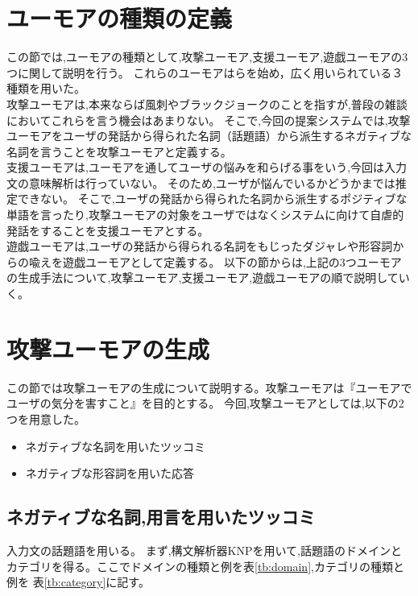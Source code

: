 \section{ユーモアの種類の定義}
この節では,ユーモアの種類として,攻撃ユーモア,支援ユーモア,遊戯ユーモアの3つに関して説明を行う。
これらのユーモアは\cite{UENO,Tani,牧野}らを始め，広く用いられている３種類を用いた。\\
\hspace{1zw}攻撃ユーモアは,本来ならば風刺やブラックジョークのことを指すが,普段の雑談においてこれらを言う機会はあまりない。
そこで,今回の提案システムでは,攻撃ユーモアをユーザの発話から得られた名詞（話題語）から派生するネガティブな名詞を言うことを攻撃ユーモアと定義する。\\
\hspace{1zw}支援ユーモアは,ユーモアを通してユーザの悩みを和らげる\cite{UENO}事をいう,今回は入力文の意味解析は行っていない。
そのため,ユーザが悩んでいるかどうかまでは推定できない。
そこで,ユーザの発話から得られた名詞から派生するポジティブな単語を言ったり,攻撃ユーモアの対象をユーザではなくシステムに向けて自虐的発話をすることを支援ユーモアとする。\\
\hspace{1zw}遊戯ユーモアは,ユーザの発話から得られる名詞をもじったダジャレや形容詞からの喩えを遊戯ユーモアとして定義する。
以下の節からは,上記の3つユーモアの生成手法について,攻撃ユーモア,支援ユーモア,遊戯ユーモアの順で説明していく。







\section{攻撃ユーモアの生成}\label{sec:attack}
この節では攻撃ユーモアの生成について説明する。攻撃ユーモアは『ユーモアでユーザの気分を害すこと』を目的とする。
今回,攻撃ユーモアとしては,以下の2つを用意した。
\begin{itemize}
\item ネガティブな名詞を用いたツッコミ
\item ネガティブな形容詞を用いた応答
\end{itemize}



\subsection{ネガティブな名詞,用言を用いたツッコミ}\label{sec:ata1}
入力文の話題語を用いる。
まず,構文解析器KNP\cite{KNP}を用いて,話題語のドメインとカテゴリを得る。ここでドメインの種類と例を表\ref{tb:domain},カテゴリの種類と例を
表\ref{tb:category}に記す。



